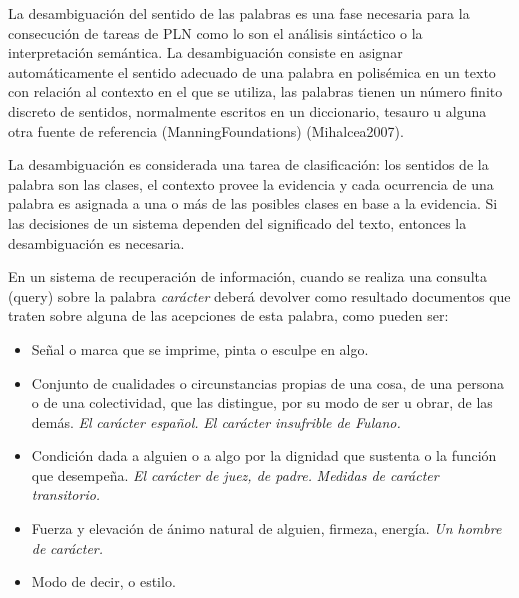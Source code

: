 \documentclass[letterpaper]{article}
\newcommand\textstylebibuscitbase[1]{#1}
\newcommand\liststyleLxi{%
\renewcommand\labelitemi{{\textbullet}}
\renewcommand\labelitemii{${\circ}$}
\renewcommand\labelitemiii{${\blacksquare}$}
\renewcommand\labelitemiv{{\textbullet}}
}
\begin{document}
{\sffamily
La desambiguaci\'on del sentido de las palabras es una fase necesaria
para la consecuci\'on de tareas de PLN como lo son el an\'alisis
sint\'actico o la interpretaci\'on sem\'antica. La desambiguaci\'on
consiste en asignar autom\'aticamente el sentido adecuado de una
palabra en polis\'emica en un texto con relaci\'on al contexto en el
que se utiliza, las palabras tienen un n\'umero finito discreto de
sentidos, normalmente escritos en un diccionario, tesauro u alguna otra
fuente de referencia
\textstylebibuscitbase{(ManningFoundations)}\textstylebibuscitbase{
}\textstylebibuscitbase{(Mihalcea2007)}.}

{\sffamily
La desambiguaci\'on es considerada una tarea de clasificaci\'on: los
sentidos de la palabra son las clases, el contexto provee la evidencia
y cada ocurrencia de una palabra es asignada a una o m\'as de las
posibles clases en base a la evidencia. \foreignlanguage{spanish}{Si
las decisiones de un sistema }\foreignlanguage{spanish}{dependen del
significado del texto, entonces la desambiguaci\'on es necesaria.}}

{\sffamily
En un sistema de recuperaci\'on de informaci\'on, cuando se realiza una
consulta (query) sobre la palabra \textit{car\'acter }deber\'a devolver
como resultado documentos que traten sobre alguna de las acepciones de
esta palabra, como pueden ser:}


\bigskip

\liststyleLxi
\begin{itemize}
\item {
Se\~nal o marca que se imprime, pinta o esculpe en algo.}
\item {
Conjunto de cualidades o circunstancias propias de una cosa, de una
persona o de una colectividad, que las distingue, por su modo de ser u
obrar, de las dem\'as. \textit{El }\textit{car\'acter espa\~nol.}
\textit{El car\'acter insufrible de Fulano.}}
\item {
Condici\'on dada a alguien o a algo por la dignidad que sustenta o la
funci\'on que desempe\~na. \textit{El car\'acter de juez, de padre.}
\textit{Medidas de car\'acter transitorio.}}
\item {
Fuerza y elevaci\'on de \'animo natural de alguien, firmeza, energ\'ia.
\textit{Un hombre de }\textit{car\'acter.}}
\item {
Modo de decir, o estilo.}
\end{itemize}
\end{document}
